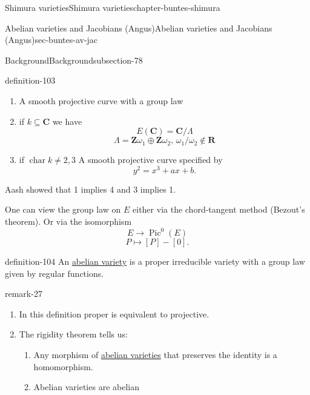 \documentclass[oneside,10pt,]{book}
\numberwithin{equation}{section}
\newcommand{\ZZ}{\mathbf{Z}}
\newcommand{\RR}{\mathbf{R}}
\newcommand{\CC}{\mathbf{C}}
\DeclareMathOperator{\Pic}{Pic}
\DeclareMathOperator{\characteristic}{char}
\begin{document}
\begin{chapterptx}{Shimura varieties}{}{Shimura varieties}{}{}{chapter-buntes-shimura}
\begin{sectionptx}{Abelian varieties and Jacobians (Angus)}{}{Abelian varieties and Jacobians (Angus)}{}{}{sec-buntes-av-jac}
\begin{subsectionptx}{Background}{}{Background}{}{}{subsection-78}
\begin{definition}{}{definition-103}
\begin{enumerate}
\item\hypertarget{li-276}{}A smooth projective curve with a group law%
\item\hypertarget{li-277}{}if \(k \subseteq \CC\) we have%
\begin{equation*}
E(\CC) = \CC/ \Lambda
\end{equation*}
%
\begin{equation*}
\Lambda = \ZZ \omega_1 \oplus \ZZ \omega_2,\, \omega_1/\omega_2 \not\in \RR
\end{equation*}
%
\item\hypertarget{li-278}{}if \(\characteristic k \ne 2,3\) A smooth projective curve specified by%
\begin{equation*}
y^2=  x^3+ ax + b\text{.}
\end{equation*}
%
\end{enumerate}
%
\end{definition}
\hypertarget{p-1090}{}%
Aash showed that 1 implies 4 and 3 implies 1.%
\par
\hypertarget{p-1091}{}%
One can view the group law on \(E\) either via the chord-tangent method (Bezout's theorem). Or via the isomorphism%
\begin{equation*}
E \to \Pic^0(E)
\end{equation*}
%
\begin{equation*}
P \mapsto [P] - [0]\text{.}
\end{equation*}
%
\begin{definition}{}{definition-104}%
\hypertarget{p-1092}{}%
An \hyperref[def-buntes-abvar]{abelian variety} is a proper irreducible variety with a group law given by regular functions.%
\end{definition}
\begin{remark}{}{remark-27}%
\hypertarget{p-1093}{}%
\leavevmode%
\begin{enumerate}
\item\hypertarget{li-279}{}In this definition proper is equivalent to projective.%
\item\hypertarget{li-280}{}\hypertarget{p-1094}{}%
The rigidity theorem tells us:%
\begin{enumerate}
\item\hypertarget{li-281}{}Any morphism of \hyperref[def-buntes-abvar]{abelian varieties} that preserves the identity is a homomorphism.%
\item\hypertarget{li-282}{}Abelian varieties are abelian%
\end{enumerate}
%
\end{enumerate}

\end{remark}
\end{subsectionptx}
\end{sectionptx}
\end{chapterptx}
\end{document}
